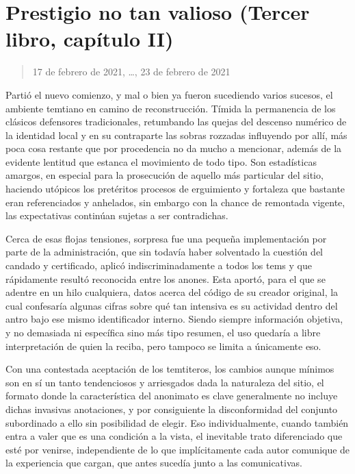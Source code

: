 \documentclass[
]{book}
\begin{document}
\hypertarget{prestigio-no-tan-valioso-tercer-libro-capuxedtulo-ii}{%
\section{Prestigio no tan valioso (Tercer libro, capítulo II)}\label{prestigio-no-tan-valioso-tercer-libro-capuxedtulo-ii}}

\begin{quote}
17 de febrero de 2021, \ldots, 23 de febrero de 2021
\end{quote}

Partió el nuevo comienzo, y mal o bien ya fueron sucediendo varios sucesos, el ambiente temtiano en camino de reconstrucción. Tímida la permanencia de los clásicos defensores tradicionales, retumbando las quejas del descenso numérico de la identidad local y en su contraparte las sobras rozzadas influyendo por allí, más poca cosa restante que por procedencia no da mucho a mencionar, además de la evidente lentitud que estanca el movimiento de todo tipo. Son estadísticas amargos, en especial para la prosecución de aquello más particular del sitio, haciendo utópicos los pretéritos procesos de erguimiento y fortaleza que bastante eran referenciados y anhelados, sin embargo con la chance de remontada vigente, las expectativas continúan sujetas a ser contradichas.

Cerca de esas flojas tensiones, sorpresa fue una pequeña implementación por parte de la administración, que sin todavía haber solventado la cuestión del candado y certificado, aplicó indiscriminadamente a todos los tems y que rápidamente resultó reconocida entre los anones. Esta aportó, para el que se adentre en un hilo cualquiera, datos acerca del código de su creador original, la cual confesaría algunas cifras sobre qué tan intensiva es su actividad dentro del antro bajo ese mismo identificador interno. Siendo siempre información objetiva, y no demasiada ni específica sino más tipo resumen, el uso quedaría a libre interpretación de quien la reciba, pero tampoco se limita a únicamente eso.

Con una contestada aceptación de los temtiteros, los cambios aunque mínimos son en sí un tanto tendenciosos y arriesgados dada la naturaleza del sitio, el formato donde la característica del anonimato es clave generalmente no incluye dichas invasivas anotaciones, y por consiguiente la disconformidad del conjunto subordinado a ello sin posibilidad de elegir. Eso individualmente, cuando también entra a valer que es una condición a la vista, el inevitable trato diferenciado que esté por venirse, independiente de lo que implícitamente cada autor comunique de la experiencia que cargan, que antes sucedía junto a las comunicativas.
\end{document}
